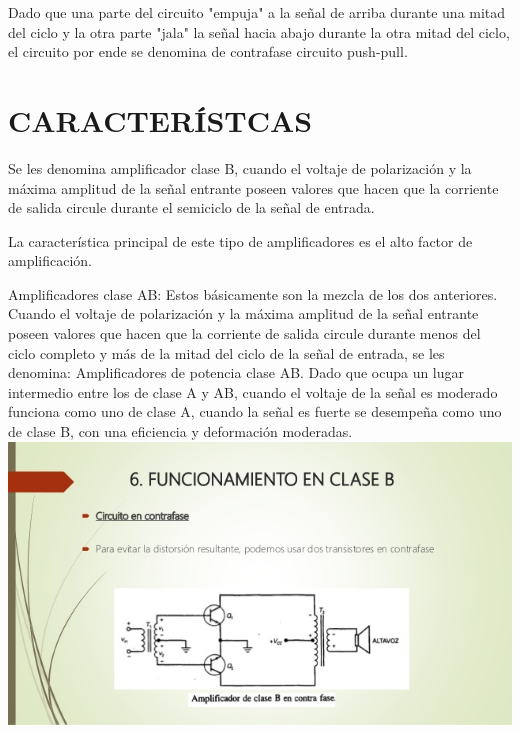 \documentclass[12pt,a4paper]{article}
\begin{document}
Dado que una parte del circuito "empuja" a la se\~nal de arriba durante una mitad del ciclo y la otra parte "jala" la se\~nal hacia abajo durante la otra mitad del ciclo, el circuito por ende se denomina de contrafase circuito push-pull.
 \\
 \section{CARACTER\'ISTCAS}
 Se les denomina amplificador clase B, cuando el voltaje de polarizaci\'on y la m\'axima amplitud de la se\~nal entrante poseen valores que hacen que la corriente de salida circule durante el semiciclo de la se\~nal de entrada.

La caracter\'istica principal de este tipo de amplificadores es el alto factor de amplificaci\'on.

Amplificadores clase AB: Estos b\'asicamente son la mezcla de los dos anteriores. Cuando el voltaje de polarizaci\'on y la m\'axima amplitud de la se\~nal entrante poseen valores que hacen que la corriente de salida circule durante menos del ciclo completo y m\'as de la mitad del ciclo de la se\~nal de entrada, se les denomina: Amplificadores de potencia clase AB.
Dado que ocupa un lugar intermedio entre los de clase A y AB, cuando el voltaje de la se\~nal es moderado funciona como uno de clase A, cuando la se\~nal es fuerte se desempe\~na como uno de clase B, con una eficiencia y deformaci\'on moderadas.\\
\includegraphics[width=18cm]{amplificadores-de-potencia-f-19-638.jpg} 
\newpage
\end{document}
